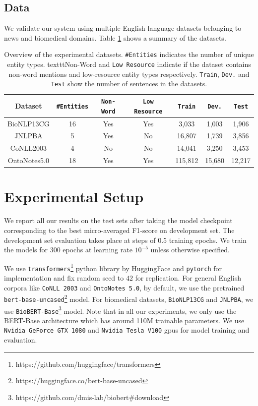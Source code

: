 \subsection{Data}

We validate our system using multiple English language datasets belonging to news and biomedical domains. 
Table \ref{tab:datasets_summary} shows a summary of the datasets.
\begin{table}[h!]
\centering
\begin{small}
\begin{tabular}{ccccccc}\toprule
 \textbf{Dataset} & \texttt{\#Entities} & \texttt{Non-Word} & \texttt{Low Resource} & \texttt{Train} & \texttt{Dev.} & \texttt{Test} \\ \toprule 
BioNLP13CG & 16 & Yes & Yes & 3,033  & 1,003 & 1,906 \\
JNLPBA     & 5 & Yes & No & 16,807 & 1,739 & 3,856 \\
CoNLL2003 & 4 & No & No & 14,041 & 3,250 & 3,453 \\
OntoNotes5.0 & 18 & Yes & Yes & 115,812 & 15,680 & 12,217 \\  \bottomrule
\end{tabular}
\caption{Overview of the experimental datasets. \texttt{\#Entities} indicates the number of unique entity types.
texttt{Non-Word} and \texttt{Low Resource} indicate if the dataset contains non-word mentions and
low-resource entity types respectively.  
\texttt{Train}, \texttt{Dev.} and \texttt{Test} show the number of sentences in the datasets.}
\label{tab:datasets_summary}
\end{small}
\end{table}

\section{Experimental Setup}
We report all our results on the test sets after taking the model checkpoint corresponding to the best micro-averaged F1-score on development set. The development set evaluation takes place at steps of 0.5 training epochs. We train the models for $300$ epochs at learning rate $10^{-5}$ unless otherwise specified.

We use \texttt{transformers}\footnote{https://github.com/huggingface/transformers} python library by HuggingFace and \texttt{pytorch} for implementation and fix random seed to $42$ for replication. For general English corpora like \texttt{CoNLL 2003} and \texttt{OntoNotes 5.0}, by default, we use the pretrained \texttt{bert-base-uncased}\footnote{https://huggingface.co/bert-base-uncased} model. For biomedical datasets, \texttt{BioNLP13CG} and \texttt{JNLPBA}, we use \texttt{BioBERT-Base}\footnote{https://github.com/dmis-lab/biobert\#download} model. Note that in all our experiments, we only use the BERT-Base architecture which has around 110M trainable parameters. We use \texttt{Nvidia GeForce GTX 1080} and \texttt{Nvidia Tesla V100} gpus for model training and evaluation.

